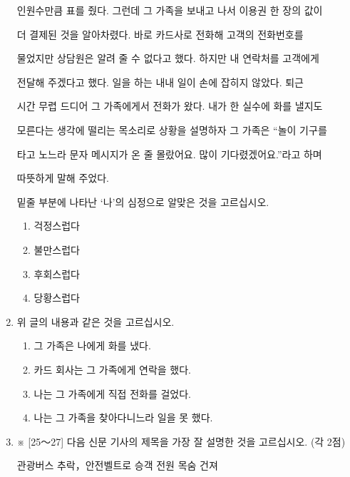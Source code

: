 \documentclass[12pt]{article}
\begin{document}
\begin{enumerate}[1.]
\begin{mdframed}
    인원수만큼 표를 줬다. 그런데 그 가족을 보내고 나서 이용권 한 장의 값이

    더 결제된 것을 알아차렸다. 바로 카드사로 전화해 고객의 전화번호를

    물었지만 상담원은 알려 줄 수 없다고 했다. 하지만 내 연락처를 고객에게

    전달해 주겠다고 했다. 일을 하는 내내 일이 손에 잡히지 않았다. 퇴근

    시간 무렵 드디어 그 가족에게서 전화가 왔다. 내가 한 실수에 화를 낼지도

    모른다는 생각에 떨리는 목소리로 상황을 설명하자 그 가족은 “놀이 기구를

    타고 노느라 문자 메시지가 온 줄 몰랐어요. 많이 기다렸겠어요.”라고 하며

    따뜻하게 말해 주었다.
    \end{mdframed}

    \bigskip

    밑줄 부분에 나타난 ‘나’의 심정으로 알맞은 것을 고르십시오.

    \bigskip

    \begin{enumerate}[1)]
        \item 걱정스럽다
        \item 불만스럽다
        \item 후회스럽다
        \item 당황스럽다
    \end{enumerate}


    \item 위 글의 내용과 같은 것을 고르십시오.

    \begin{enumerate}[1)]
        \item 그 가족은 나에게 화를 냈다.
        \item 카드 회사는 그 가족에게 연락을 했다.
        \item 나는 그 가족에게 직접 전화를 걸었다.
        \item 나는 그 가족을 찾아다니느라 일을 못 했다.
    \end{enumerate}



    \item ※ [25～27] 다음 신문 기사의 제목을 가장 잘 설명한 것을 고르십시오. (각 2점)

    \bigskip

    관광버스 추락，안전벨트로 승객 전원 목숨 건져

    \bigskip


\end{enumerate}
\end{document}
